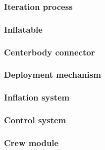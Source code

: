 \subsubsection{Iteration process}\label{subsec:itproc}


\subsubsection{Inflatable}\label{subsec:infldes}


\subsubsection{Centerbody connector}\label{subsec:centerbodydes}


\subsubsection{Deployment mechanism}\label{subsec:depldes}


\subsubsection{Inflation system}\label{subsec:inflsys}


\subsubsection{Control system}\label{subsec:controlsys}


\subsubsection{Crew module}\label{subsec:crewmod}


